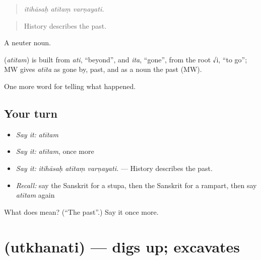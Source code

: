 \begin{quote}
  
\end{quote}

\begin{quote}
\emph{itihāsaḥ atītaṃ varṇayati.}
\end{quote}

\begin{quote}
History describes the past.
\end{quote}

A neuter noun.

\begin{cousinweb}
\textbf{} (\emph{atītam}) is built from \emph{ati}, \textquotedblleft{}beyond\textquotedblright{}, and \emph{ita}, \textquotedblleft{}gone\textquotedblright{}, from the root √i, \textquotedblleft{}to go\textquotedblright{}; MW gives \emph{atīta} as gone by, past, and as a noun the past (MW).
\end{cousinweb}

\begin{grammarlens}[title={What you've built}]
One more word for telling what happened.
\end{grammarlens}

\subsection*{Your turn}
\begin{itemize}
\raggedright
  \item \emph{Say it:} \emph{atītam}
  \item \emph{Say it:} \emph{atītam}, once more
  \item \emph{Say it:} \emph{itihāsaḥ atītaṃ varṇayati.} — History describes the past.
  \item \emph{Recall:} say the Sanskrit for a stupa, then the Sanskrit for a rampart, then say \emph{atītam} again
\end{itemize}

\begin{tcolorbox}[breakable,colback=teal!4,colframe=teal!35!black,title={Before you move on}]
What does  mean? (\textquotedblleft{}The past\textquotedblright{}.) Say it once more.
\end{tcolorbox}
\section[\texorpdfstring{\sk{उत्खनति} (utkhanati)}{उत्खनति (utkhanati)}]{ (utkhanati) — digs up; excavates}

